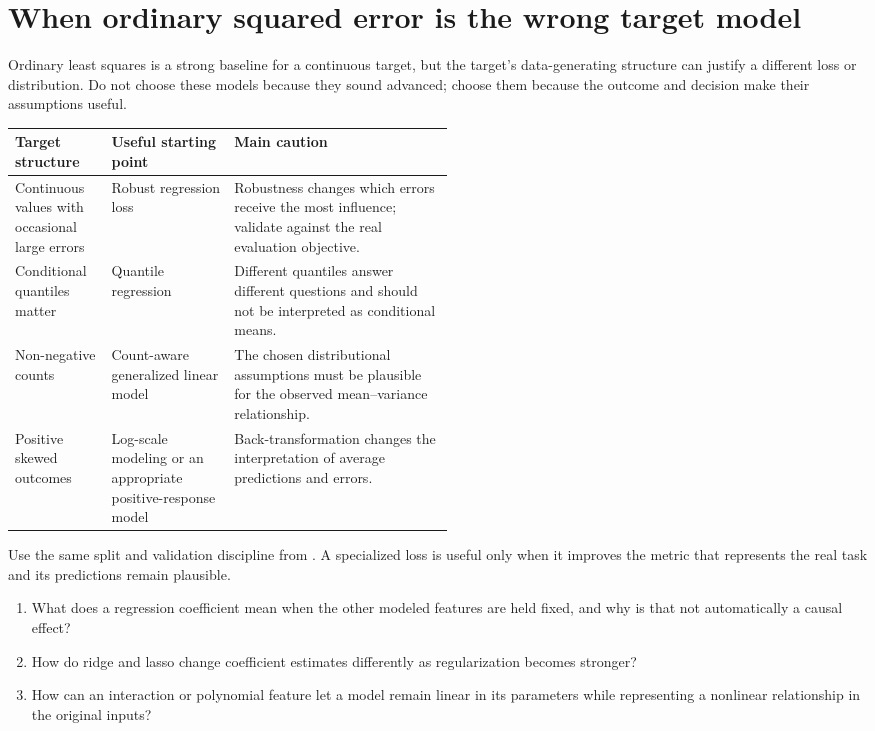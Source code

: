 \section{When ordinary squared error is the wrong target model}
\label{sec:special-regression-targets}

Ordinary least squares is a strong baseline for a continuous target, but the target's data-generating structure can justify a different loss or distribution. Do not choose these models because they sound advanced; choose them because the outcome and decision make their assumptions useful.

\begin{mltable}
\begin{tabularx}{\linewidth}{@{}p{0.22\linewidth}p{0.29\linewidth}X@{}}
\toprule
\rowcolor{MLPaleBlue!92}
Target structure & Useful starting point & Main caution \\
\midrule
Continuous values with occasional large errors & Robust regression loss & Robustness changes which errors receive the most influence; validate against the real evaluation objective. \\
Conditional quantiles matter & Quantile regression & Different quantiles answer different questions and should not be interpreted as conditional means. \\
Non-negative counts & Count-aware generalized linear model & The chosen distributional assumptions must be plausible for the observed mean--variance relationship. \\
Positive skewed outcomes & Log-scale modeling or an appropriate positive-response model & Back-transformation changes the interpretation of average predictions and errors. \\
\bottomrule
\end{tabularx}
\end{mltable}

Use the same split and validation discipline from . A specialized loss is useful only when it improves the metric that represents the real task and its predictions remain plausible.




\begin{quickcheck}
\begin{enumerate}
  \item What does a regression coefficient mean when the other modeled features are held fixed, and why is that not automatically a causal effect?
  \item How do ridge and lasso change coefficient estimates differently as regularization becomes stronger?
  \item How can an interaction or polynomial feature let a model remain linear in its parameters while representing a nonlinear relationship in the original inputs?
\end{enumerate}
\end{quickcheck}

